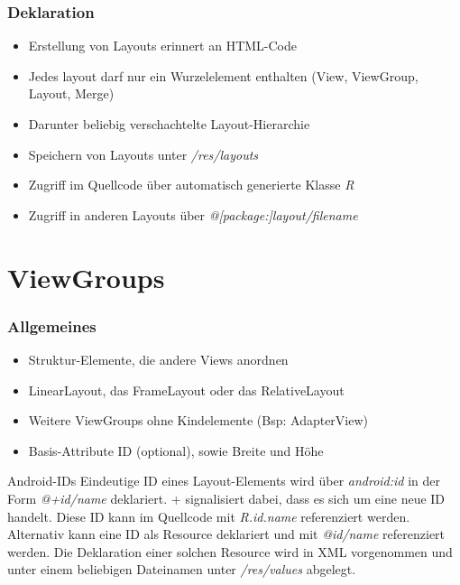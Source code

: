 \begin{frame}
   \frametitle{Deklaration}
   \begin{itemize}
      \item Erstellung von Layouts erinnert an HTML-Code
      \item Jedes layout darf nur ein Wurzelelement enthalten 
         (View, ViewGroup, Layout, Merge)
      \item Darunter beliebig verschachtelte Layout-Hierarchie
      \item Speichern von Layouts unter \emph{/res/layouts}
      \item Zugriff im Quellcode über automatisch generierte Klasse \emph{R}
      \item Zugriff in anderen Layouts über \emph{@[package:]layout/filename}
   \end{itemize}
\end{frame}

\section{ViewGroups}
\begin{frame}
   \frametitle{Allgemeines}
   \begin{itemize}
      \item Struktur-Elemente, die andere Views anordnen
      \item LinearLayout, das FrameLayout oder das RelativeLayout
      \item Weitere ViewGroups ohne Kindelemente (Bsp: AdapterView)
      \item Basis-Attribute ID (optional), sowie Breite und Höhe
   \end{itemize}

   \begin{alertblock}{Android-IDs}
      Eindeutige ID eines Layout-Elements wird über \emph{android:id} 
      in der Form \emph{@+id/name} deklariert. + signalisiert dabei, dass es sich 
      um eine neue ID handelt. Diese ID kann im Quellcode mit \emph{R.id.name} 
      referenziert werden.\\

      Alternativ kann eine ID als Resource deklariert und mit \emph{@id/name} 
      referenziert werden. Die Deklaration einer solchen Resource wird in XML vorgenommen 
      und unter einem beliebigen Dateinamen unter \emph{/res/values} abgelegt.\\

      
   \end{alertblock}
\end{frame}

